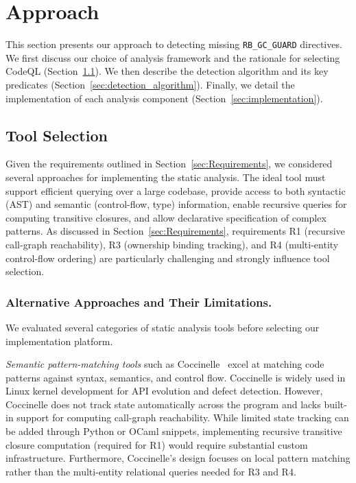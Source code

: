 \section{Approach}\label{sec:Approach}

This section presents our approach to detecting missing \texttt{RB\_GC\_GUARD} directives. We first discuss our choice of analysis framework and the rationale for selecting CodeQL (Section~\ref{sec:tool_selection}). We then describe the detection algorithm and its key predicates (Section~\ref{sec:detection_algorithm}). Finally, we detail the implementation of each analysis component (Section~\ref{sec:implementation}).

\subsection{Tool Selection}\label{sec:tool_selection}

Given the requirements outlined in Section~\ref{sec:Requirements}, we considered several approaches for implementing the static analysis. The ideal tool must support efficient querying over a large codebase, provide access to both syntactic (AST) and semantic (control-flow, type) information, enable recursive queries for computing transitive closures, and allow declarative specification of complex patterns. As discussed in Section~\ref{sec:Requirements}, requirements R1 (recursive call-graph reachability), R3 (ownership binding tracking), and R4 (multi-entity control-flow ordering) are particularly challenging and strongly influence tool selection.

\subsubsection*{Alternative Approaches and Their Limitations.}
We evaluated several categories of static analysis tools before selecting our implementation platform.

\emph{Semantic pattern-matching tools} such as Coccinelle~\cite{UgawaFujimoto2019PRO} excel at matching code patterns against syntax, semantics, and control flow. Coccinelle is widely used in Linux kernel development for API evolution and defect detection. However, Coccinelle does not track state automatically across the program and lacks built-in support for computing call-graph reachability. While limited state tracking can be added through Python or OCaml snippets, implementing recursive transitive closure computation (required for R1) would require substantial custom infrastructure. Furthermore, Coccinelle's design focuses on local pattern matching rather than the multi-entity relational queries needed for R3 and R4.

